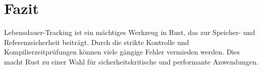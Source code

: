 \section{Fazit}
Lebensdauer-Tracking ist ein mächtiges Werkzeug in Rust, das zur Speicher- und Referenzsicherheit beiträgt. 
Durch die strikte Kontrolle und Kompilierzeitprüfungen können viele gängige Fehler vermieden werden. 
Dies macht Rust zu einer Wahl für sicherheitskritische und performante Anwendungen.

